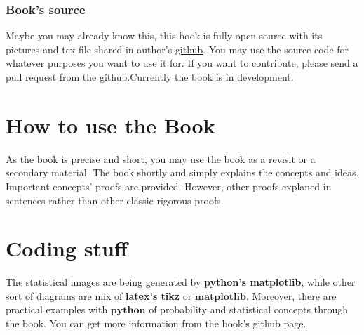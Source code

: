 \subsubsection*{Book's source}
Maybe you may already know this, this book is fully open source with its pictures and tex file shared in author's \href{https://github.com/JosephMehdiyev}{github}. You may use the source code for whatever purposes you want to use it for. If you want to contribute, please send a pull request from the github.Currently the book is in development.

\section*{How to use the Book}
As the book is precise and short, you may use the book as a revisit or a secondary material. The book shortly and simply explains the concepts and ideas. Important concepts' proofs are provided. However, other proofs explaned in sentences rather than other classic rigorous proofs.

\section*{Coding stuff}
The statistical images are being generated by \textbf{python's matplotlib}, while other sort of diagrams are mix of \textbf{latex's tikz} or $\textbf{matplotlib}$. Moreover, there are practical examples  with $\textbf{python}$ of probability and statistical concepts through the book. You can get more information from the book's github page.
